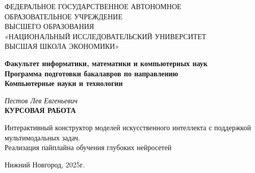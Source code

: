 \documentclass[14pt]{extarticle}
\begin{document}
\begin{titlepage}
\begin{center}
\normalsize
\normalsize{ФЕДЕРАЛЬНОЕ ГОСУДАРСТВЕННОЕ АВТОНОМНОЕ\\ОБРАЗОВАТЕЛЬНОЕ УЧРЕЖДЕНИЕ\\ВЫСШЕГО ОБРАЗОВАНИЯ\\«НАЦИОНАЛЬНЫЙ ИССЛЕДОВАТЕЛЬСКИЙ УНИВЕРСИТЕТ\\

ВЫСШАЯ ШКОЛА ЭКОНОМИКИ»}

\vfill

\textbf{Факультет информатики, математики и компьютерных наук}\\[3mm]

\textbf{Программа подготовки бакалавров по направлению\\Компьютерные науки и технологии}

\vfill

\textit{Пестов Лев Евгеньевич}\\[3mm]

\textbf{КУРСОВАЯ РАБОТА}\\[10mm]

\normalsize{ 
 	
Интерактивный конструктор моделей искусственного интеллекта с поддержкой мультимодальных задач. \\Реализация пайплайна обучения глубоких нейросетей}

\end{center}

\vfill
\newlength{\ML}
\hfill
\begin{minipage}{0.4\textwidth}
\end{minipage}%
\vfill
\begin{center}

Нижний Новгород, 2025г.

\end{center}
\end{titlepage}
\end{document}
